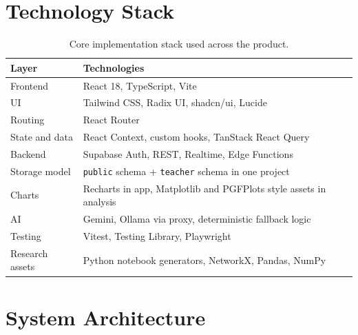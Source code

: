 \documentclass[10pt,twocolumn,a4paper]{article}
\newcommand{\tech}[1]{\texttt{#1}}
\begin{document}
\section{Technology Stack}
\begin{table}[h]
\centering
\footnotesize
\begin{tabular}{>{\raggedright\arraybackslash}p{} >{\raggedright\arraybackslash}p{}}
\toprule
Layer & Technologies \\
\midrule
Frontend & React 18, TypeScript, Vite \\
UI & Tailwind CSS, Radix UI, shadcn/ui, Lucide \\
Routing & React Router \\
State and data & React Context, custom hooks, TanStack React Query \\
Backend & Supabase Auth, REST, Realtime, Edge Functions \\
Storage model & \tech{public} schema + \tech{teacher} schema in one project \\
Charts & Recharts in app, Matplotlib and PGFPlots style assets in analysis \\
AI & Gemini, Ollama via proxy, deterministic fallback logic \\
Testing & Vitest, Testing Library, Playwright \\
Research assets & Python notebook generators, NetworkX, Pandas, NumPy \\
\bottomrule
\end{tabular}
\caption{Core implementation stack used across the product.}
\end{table}

\section{System Architecture}
\end{document}
